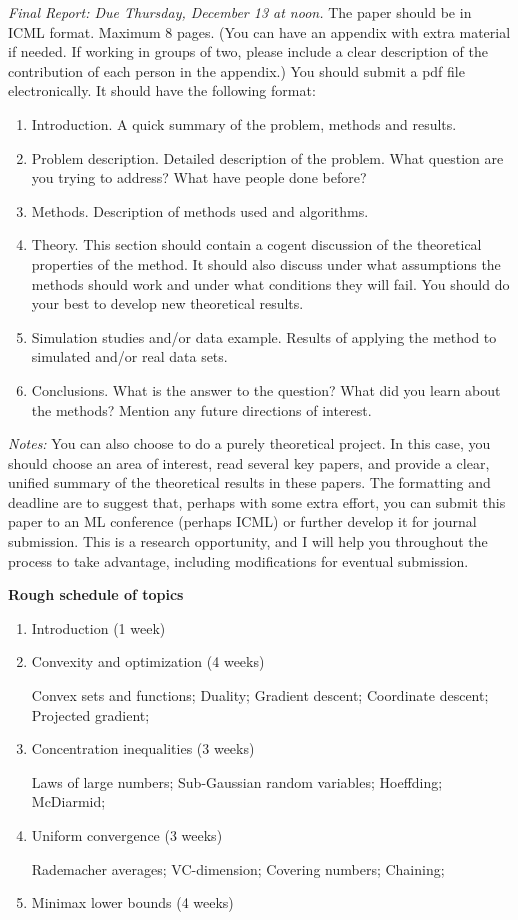 \documentclass[10pt]{article}
\begin{document}
{\em Final Report: Due Thursday, December 13 at noon.} The paper should be in
ICML format. Maximum 8 pages. (You can have an appendix with extra
material if needed. If working in groups of two, please include a
clear description of the contribution of each person in the appendix.)
You should submit a pdf file electronically. It should have the
following format: 
\begin{enumerate}
\item Introduction. A quick summary of the problem, methods and results.
\item Problem description. Detailed description of the problem. What
  question are you trying to address? What have people done before?
\item Methods. Description of methods used and algorithms.
\item Theory. This section should contain a cogent discussion of the
  theoretical properties of the 
  method. It should also discuss under what assumptions the methods
  should work and under 
  what conditions they will fail. You should do your best to develop
  new theoretical results.
\item Simulation studies and/or data example. Results of applying the
  method to simulated and/or real data sets.
\item Conclusions. What is the answer to the question? What did you learn about the methods?
Mention any future directions of interest.
\end{enumerate}

{\em Notes:} You can also choose to do a purely theoretical project. In
this case, you should choose an area of interest, read several key
papers, and provide a clear, unified summary of the theoretical
results in these papers. The formatting and deadline are to suggest that, perhaps
with some extra effort, you can submit this paper to an ML conference
(perhaps ICML) or further develop it for journal submission. This is a
research opportunity, and I will help you throughout the process to
take advantage, including modifications for eventual submission.

{\bf Rough schedule of topics}

\begin{enumerate}
\item Introduction (1 week)
\item Convexity and optimization (4 weeks)

Convex sets and functions; Duality; Gradient descent; Coordinate
descent; Projected gradient; 

\item Concentration inequalities (3 weeks)

Laws of large numbers; Sub-Gaussian random variables; Hoeffding; McDiarmid;
\item Uniform convergence (3 weeks)

Rademacher averages; VC-dimension; Covering numbers; Chaining;
\item Minimax lower bounds (4 weeks)

\end{enumerate}



\end{document}
